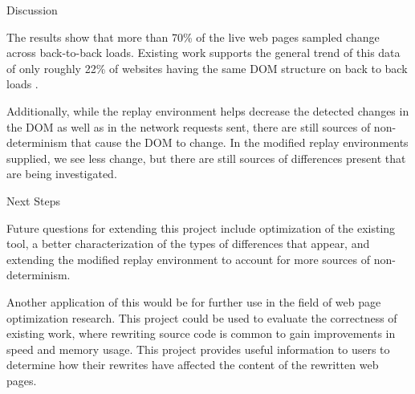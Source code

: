 \documentclass[final]{beamer}
\newlength{\onecolwid}
\begin{document}
\begin{frame}[t]
\begin{columns}[t]
\begin{column}{\onecolwid} %


\begin{block}{Discussion}

The results show that more than 70\% of the  live web pages sampled change across back-to-back loads. Existing work supports the general trend of this data of only roughly 22\% of websites having the same DOM structure on back to back loads \cite{ruamviboonsuk_netravali_uluyol_madhyastha_2017}. 

Additionally, while the replay environment helps decrease the detected changes in the DOM as well as in the network requests sent, there are still sources of non-determinism that cause the DOM to change. In the modified replay environments supplied, we see less change, but there are still sources of differences present that are being investigated. 

\end{block}


\begin{block}{Next Steps}

Future questions for extending this project include optimization of the existing tool, a better characterization of the types of differences that appear, and extending the modified replay environment to account for more sources of non-determinism. 

Another application of this would be for further use in the field of web page optimization research. This project could be used to evaluate the correctness of existing work, where rewriting source code is common to gain improvements in speed and memory usage. This project provides useful information to users to determine how their rewrites have affected the content of the rewritten web pages.
\end{block}



\end{column}
\end{columns}
\end{frame}
\end{document}
